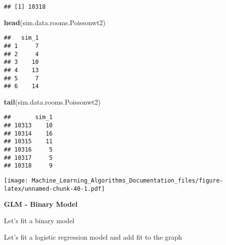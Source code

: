 \documentclass[
]{article}
\newenvironment{Shaded}{\begin{snugshade}}{\end{snugshade}}
\newcommand{\CharTok}[1]{\textcolor[rgb]{0.31,0.60,0.02}{#1}}
\newcommand{\DataTypeTok}[1]{\textcolor[rgb]{0.13,0.29,0.53}{#1}}
\newcommand{\DecValTok}[1]{\textcolor[rgb]{0.00,0.00,0.81}{#1}}
\newcommand{\KeywordTok}[1]{\textcolor[rgb]{0.13,0.29,0.53}{\textbf{#1}}}
\newcommand{\NormalTok}[1]{#1}
\newcommand{\OperatorTok}[1]{\textcolor[rgb]{0.81,0.36,0.00}{\textbf{#1}}}
\newcommand{\StringTok}[1]{\textcolor[rgb]{0.31,0.60,0.02}{#1}}
\begin{document}
\begin{verbatim}
## [1] 10318
\end{verbatim}

\begin{Shaded}
\begin{Highlighting}[]
\KeywordTok{head}\NormalTok{(sim.data.rooms.Poissonwt2)}
\end{Highlighting}
\end{Shaded}

\begin{verbatim}
##   sim_1
## 1     7
## 2     4
## 3    10
## 4    13
## 5     7
## 6    14
\end{verbatim}

\begin{Shaded}
\begin{Highlighting}[]
\KeywordTok{tail}\NormalTok{(sim.data.rooms.Poissonwt2)}
\end{Highlighting}
\end{Shaded}

\begin{verbatim}
##       sim_1
## 10313    10
## 10314    16
## 10315    11
## 10316     5
## 10317     5
## 10318     9
\end{verbatim}

\begin{Shaded}
\end{Shaded}

\texttt{[image: Machine\_Learning\_Algorithms\_Documentation\_files/figure-latex/unnamed-chunk-40-1.pdf]}

\textbf{GLM - Binary Model}

Let's fit a binary model

Let's fit a logistic regression model and add fit to the graph
\end{document}
